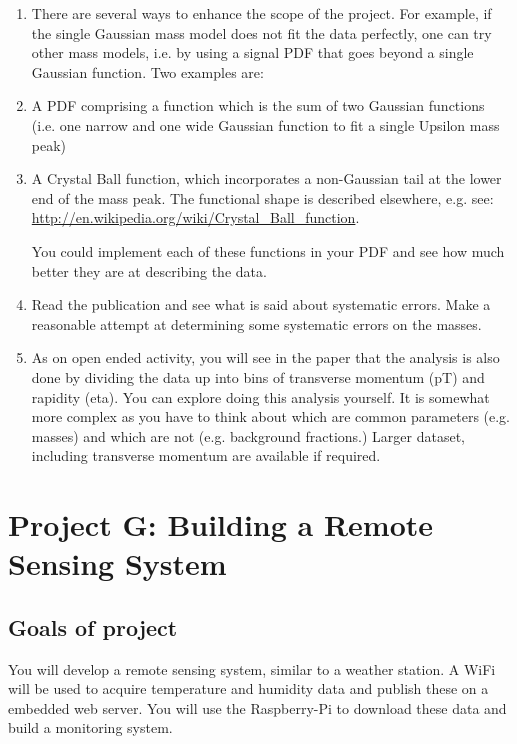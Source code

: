 \begin{enumerate}
\item There are several ways to enhance the scope of the project. For example, if the single Gaussian mass model does not fit the data perfectly, one can try other mass models, i.e. by using a signal PDF that goes beyond a single Gaussian function.  Two examples are:
\item A PDF comprising a function which is the sum of two Gaussian functions (i.e. one narrow and one wide Gaussian function to fit a single Upsilon mass peak)
\item A Crystal Ball function, which incorporates a non-Gaussian tail at the lower end of the mass peak. The functional shape is described elsewhere, e.g. see: \url{http://en.wikipedia.org/wiki/Crystal_Ball_function}. 

You could implement each of these functions in your PDF and see how much better they are at describing the data.

\item Read the publication and see what is said about systematic errors.  Make a reasonable attempt at determining some systematic errors on the masses.

\item As on open ended activity, you will see in the paper that the analysis is also done by dividing the data up into bins of transverse momentum (pT) and rapidity (eta). You can explore doing this analysis yourself. It is somewhat more complex as you have to think about which are common parameters (e.g. masses) and which are not (e.g. background fractions.) Larger dataset, including transverse momentum are available if required.

\end{enumerate}

 
 
 
\newpage
\section{Project G: Building a Remote Sensing System}

\subsection{Goals of project}

You will develop a remote sensing system, similar to a weather station.
A WiFi \microcontroller will be used to acquire temperature and humidity data
and publish these on a embedded web server. You will use the Raspberry-Pi to
download these data and build a monitoring system.


